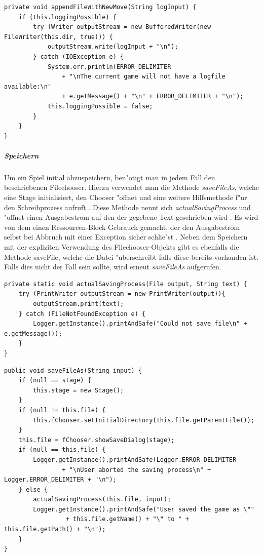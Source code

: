 \begin{lstlisting}[float,style=CodeHighlighting,caption=Logger - appendFileWithNewMove,label=lst:logger_appendFileWithNewMove]
private void appendFileWithNewMove(String logInput) {
    if (this.loggingPossible) {
        try (Writer outputStream = new BufferedWriter(new FileWriter(this.dir, true))) {
            outputStream.write(logInput + "\n");
        } catch (IOException e) {
            System.err.println(ERROR_DELIMITER 
            	+ "\nThe current game will not have a logfile available:\n"
                + e.getMessage() + "\n" + ERROR_DELIMITER + "\n");
            this.loggingPossible = false;
        }
    }
}
\end{lstlisting}

\subparagraph{Speichern}
Um ein Spiel initial abzuspeichern, ben"otigt man in jedem Fall den beschriebenen Filechooser. Hierzu verwendet man die Methode \emph{saveFileAs}, welche eine Stage initialisiert, den Chooser "offnet und eine weitere Hilfsmethode f"ur den Schreibprozess aufruft . Diese Methode nennt sich \emph{actualSavingProcess} und "offnet einen Ausgabestrom auf den der gegebene Text geschrieben wird . Es wird von dem einen Ressourcen-Block Gebrauch gemacht, der den Ausgabestrom selbst bei Abbruch mit einer Exception sicher schlie"st 
\cite{try-with-resources}. 
Neben dem Speichern mit der expliziten Verwendung des Filechooser-Objekts gibt es ebenfalls die Methode {saveFile}, welche die Datei "uberschreibt falls diese bereits vorhanden ist. Falls dies nicht der Fall sein sollte, wird erneut \emph{saveFileAs} aufgerufen. 

\begin{lstlisting}[float,style=CodeHighlighting,caption=Loader - actualSavingProcess,label=lst:loader_actualSavingProcess]
private static void actualSavingProcess(File output, String text) {
    try (PrintWriter outputStream = new PrintWriter(output)){
        outputStream.print(text);
    } catch (FileNotFoundException e) {
        Logger.getInstance().printAndSafe("Could not save file\n" + e.getMessage());
    }
}
\end{lstlisting}

\begin{lstlisting}[float,style=CodeHighlighting,caption=Loader - saveFileAs,label=lst:loader_saveFileAs]
public void saveFileAs(String input) {
    if (null == stage) {
        this.stage = new Stage();
    }
    if (null != this.file) {
        this.fChooser.setInitialDirectory(this.file.getParentFile());
    }
    this.file = fChooser.showSaveDialog(stage);
    if (null == this.file) {
        Logger.getInstance().printAndSafe(Logger.ERROR_DELIMITER
                + "\nUser aborted the saving process\n" + Logger.ERROR_DELIMITER + "\n");
    } else {
        actualSavingProcess(this.file, input);
        Logger.getInstance().printAndSafe("User saved the game as \""
        		 + this.file.getName() + "\" to " + this.file.getPath() + "\n");
    }
}
\end{lstlisting}
